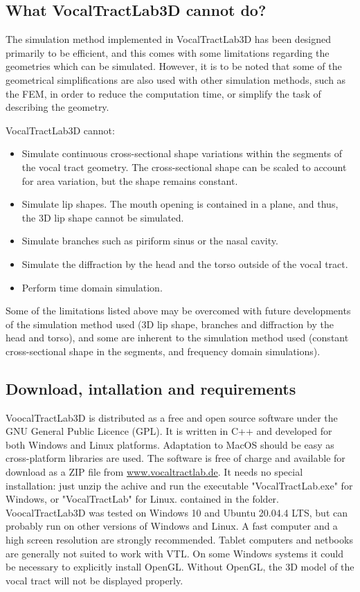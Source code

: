 \documentclass[]{article}
\begin{document}
	\subsection{What VocalTractLab3D cannot do?} 
	The simulation method implemented in VocalTractLab3D has been 
	designed primarily to be efficient, and this comes with some 
	limitations regarding the geometries which can be simulated.
	However, it is to be noted that some of the geometrical simplifications are also used with other simulation methods, such as the \ac{FEM}, 
	in order to reduce the computation time, or simplify the task of describing the geometry.
	
	VocalTractLab3D cannot:
	\begin{itemize}
		\item Simulate continuous cross-sectional shape variations within the segments of the vocal tract geometry. The cross-sectional shape can be scaled to account for area variation, but the shape remains constant.
		\item Simulate lip shapes. The mouth opening is contained 
		in a plane, and thus, the 3D lip shape cannot be simulated.
		\item Simulate branches such as piriform sinus or the nasal 
		cavity.
		\item Simulate the diffraction by the head and the torso outside
		of the vocal tract.
		\item Perform time domain simulation.
	\end{itemize}

	Some of the limitations listed above may be overcomed with future developments of the simulation method used (3D lip shape, branches 
	and diffraction by the head and torso), and some are inherent to 
	the simulation method used (constant cross-sectional shape in the 
	segments, and frequency domain simulations).
	
	\subsection{Download, intallation and requirements}
	
	VoocalTractLab3D is distributed as a free and open source software under the
	GNU General Public Licence (GPL).
	It is written in C++ and developed for both Windows and Linux platforms.
	Adaptation to MacOS should be easy as cross-platform libraries are used.
	The software is free of charge and available for download as a ZIP file from
	\url{www.vocaltractlab.de}.
	It needs no special installation: just unzip the achive and run the executable
	"VocalTractLab.exe" for Windows, or "VocalTractLab" for Linux. 
	contained in the folder.
	VoocalTractLab3D was tested on Windows 10 and Ubuntu 20.04.4 LTS, but can probably 
	run on other versions of Windows and Linux.
	A fast computer and a high screen resolution are strongly recommended. 
	Tablet computers and netbooks are generally not suited to work with VTL. 
	On some Windows systems it could be necessary to explicitly install OpenGL. 
	Without OpenGL, the 3D model of the vocal tract will not
	be displayed properly.
	
\end{document}
